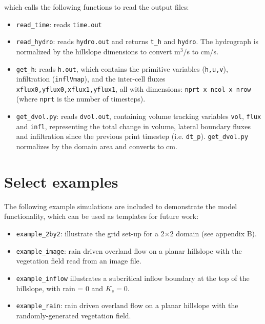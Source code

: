 \documentclass{article}
\newcommand{\code}[1]{\texttt{#1}}
\begin{document}
which calls the following functions to read the output files:
\begin{itemize}
	\item \code{read\_time}: reads \code{time.out}
	\item \code{read\_hydro}: reads \code{hydro.out} and returns \code{t\_h} and \code{hydro}. The hydrograph is normalized by the hillslope dimensions to convert m$^3$/s to cm/s.
	\item \code{get\_h}: reads \code{h.out}, which contains the primitive variables (\code{h,u,v}), infiltration  (\code{inflVmap}), and the inter-cell fluxes \code{xflux0,yflux0,xflux1,yflux1}, all with dimensions: \code{nprt x ncol x nrow} (where \code{nprt} is the number of timesteps).
	\item \code{get\_dvol.py}: reads \code{dvol.out}, containing volume tracking variables  \code{vol},  \code{flux} and  \code{infl}, representing the total change in volume, lateral boundary fluxes and infiltration since the previous print timestep (i.e. \code{dt\_p}). \code{get\_dvol.py} normalizes by the domain area and converts to cm. 
\end{itemize}

 

	
\section{Select examples}	
\label{select_examples}

The following example simulations are included to demonstrate the model functionality, which can be used as templates for future work:
\begin{itemize}
	\item \code{example\_2by2}: illustrate the grid set-up for a 2$\times$2 domain (see appendix B).
	\item  \code{example\_image}: rain driven overland flow on a planar hillslope with the vegetation field read from an image file.
	\item \code{example\_inflow} illustrates a subcritical inflow boundary at the top of the hillslope, with rain = 0 and $K_s=0$.
	\item \code{example\_rain}:  rain driven overland flow on a planar hillslope with the randomly-generated vegetation field.
\end{itemize}
\end{document}

